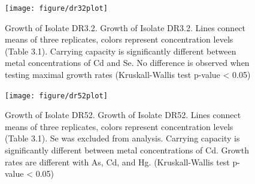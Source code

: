 \documentclass[ms, hidelinks]{uncgdissertationexp3}
\theoremstyle{plain}
\theoremstyle{definition}
\theoremstyle{remark}
\newcommand{\titlecaption}[2]{\caption[#1]{#1. #2}}
\begin{document}
\begin{figure}[t]
  \centering
  \texttt{[image: figure/dr32plot]}
  \titlecaption{Growth of Isolate DR3.2}{Growth of Isolate DR3.2. Lines connect means of three replicates, colors represent concentration levels (Table 3.1). Carrying capacity is significantly different between metal concentrations of Cd and Se. No difference is observed when testing maximal growth rates (Kruskall-Wallis test p-value < 0.05)}
  \label{fig:dr32}
\end{figure}

\begin{figure}[t]
  \centering
  \texttt{[image: figure/dr52plot]}
  \titlecaption{Growth of Isolate DR52}{Growth of Isolate DR52. Lines connect means of three replicates, colors represent concentration levels (Table 3.1). Se was excluded from analysis. Carrying capacity is significantly different between metal concentrations of Cd. Growth rates are different with As, Cd, and Hg. (Kruskall-Wallis test p-value < 0.05) }
  \label{fig:dr52}
\end{figure}
\end{document}
